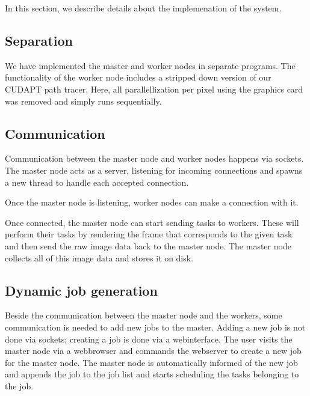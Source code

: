 In this section, we describe details about the implemenation of the system.

\subsection{Separation}
We have implemented the master and worker nodes in separate programs.
The functionality of the worker node includes a stripped down version of our CUDAPT\cite{cudapt} path tracer.
Here, all parallellization per pixel using the graphics card was removed and simply runs sequentially.

\subsection{Communication}
Communication between the master node and worker nodes happens via sockets.
The master node acts as a server, listening for incoming connections and spawns a new thread to handle each accepted connection.

Once the master node is listening, worker nodes can make a connection with it.

Once connected, the master node can start sending tasks to workers.
These will perform their tasks by rendering the frame that corresponds to the given task and then send the raw image data back to the master node.
The master node collects all of this image data and stores it on disk.

\subsection{Dynamic job generation}
Beside the communication between the master node and the workers, some communication is needed to add new jobs to the master. Adding a new job is not done via sockets; creating a job is done via a webinterface. The user visits the master node via a webbrowser and commands the webserver to create a new job for the master node. The master node is automatically informed of the new job and appends the job to the job list and starts scheduling the tasks belonging to the job.